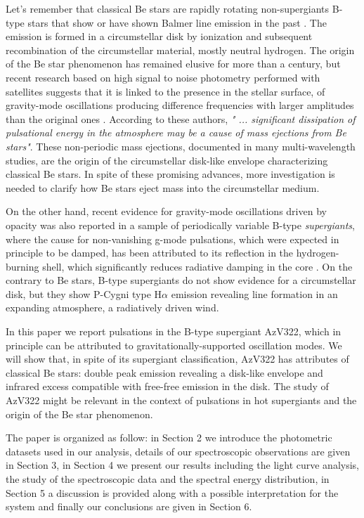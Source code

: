 \documentclass[useAMS,usenatbib]{mn2e}
\begin{document}
Let's remember that classical Be stars are rapidly rotating non-supergiants B-type stars that show or have shown Balmer line emission in the past \citep{2013A&ARv..21...69R}. The emission is formed in a circumstellar disk by ionization and subsequent recombination of the circumstellar material, mostly neutral hydrogen. The origin of the Be star phenomenon has remained elusive for more than a century,  but recent research based on high signal to noise photometry performed with satellites suggests that it is linked to the presence in the stellar surface, of gravity-mode oscillations producing difference frequencies with larger amplitudes than the original ones \citep{2016arXiv161101113B}. According to these authors, {\it " ... significant dissipation of pulsational energy in the atmosphere may be a cause of mass ejections from Be stars"}. These non-periodic mass ejections, documented in many multi-wavelength studies, are the origin of the circumstellar disk-like envelope characterizing classical Be stars. In spite of these promising advances, more investigation is needed to clarify how Be stars eject mass into the circumstellar medium. 

On the other hand, recent evidence for gravity-mode oscillations driven by opacity was also reported in a sample of periodically variable B-type {\it supergiants}, where the cause
for non-vanishing g-mode pulsations, which were expected in principle to be damped, has been attributed to  its reflection in the hydrogen-burning shell, which significantly reduces radiative damping in the core
\citep{2007A&A...463.1093L, 2006ApJ...650.1111S}. On the contrary to Be stars, B-type supergiants do not show evidence for a circumstellar disk, but they show P-Cygni type H$\alpha$ emission revealing line formation in an expanding atmosphere, a radiatively driven wind. 

In this paper we report pulsations in the B-type supergiant AzV322, which in principle can be attributed to gravitationally-supported oscillation modes. We will show that, in spite of its supergiant classification, AzV322 has attributes of classical Be stars: double peak emission revealing a disk-like envelope and infrared excess compatible with free-free emission in the disk. 
The study of AzV322  might  be relevant in the context of pulsations in hot supergiants and the origin of the Be star phenomenon. 

The paper is organized as follow: in Section 2 we introduce the photometric datasets used in our analysis,  details of our spectroscopic observations are given in Section 3, in Section 4 we present our results including the light curve analysis, the study of the spectroscopic data and the spectral energy distribution,  in Section 5 a discussion is provided along with a possible interpretation for the system and finally  our conclusions are given in Section 6.    
\end{document}
